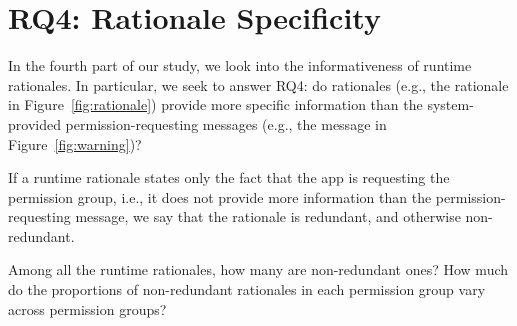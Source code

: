 \vspace{-0.05in}
\section{RQ4: Rationale Specificity}
\label{sec:rq4}

In the fourth part of our study, we look into the informativeness of runtime rationales. 
In particular, we seek to answer RQ4: do rationales (e.g., the rationale in Figure~\ref{fig:rationale}) provide more specific information than the system-provided permission-requesting messages (e.g., the message in Figure~\ref{fig:warning})?


\begin{mydef}
If a runtime rationale states only the fact that the app is requesting the permission group, i.e., it does not provide more information than the permission-requesting message, we say that the rationale is redundant, and otherwise non-redundant. 
\end{mydef}

Among all the runtime rationales, how many are non-redundant ones? How much do the proportions of non-redundant rationales in each permission group vary across  permission groups?


